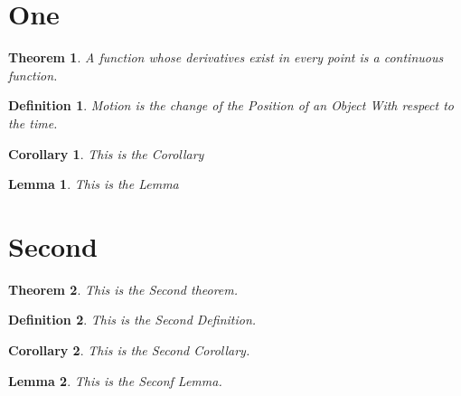 \documentclass{article}
\newtheorem{theorem}{Theorem}[section]
\newtheorem{definition}{Definition}[section]
\newtheorem{corollary}{Corollary}[section]
\newtheorem{lemma}{Lemma}[section]
\begin{document}
	\section{One}
	\begin{theorem}
		A function whose derivatives exist in every point is a continuous function.
	\end{theorem}
	\begin{definition}
		Motion is the change of the Position of an Object With respect to the time.
	\end{definition}
	\begin{corollary}
		This is the Corollary 
	\end{corollary}
	\begin{lemma}
		This is the Lemma
	\end{lemma}
	\section{Second}
	\begin{theorem}
		This is the Second theorem.
	\end{theorem}
	\begin{definition}
		This is the Second Definition.
	\end{definition}
	\begin{corollary}
		This is the Second Corollary.
	\end{corollary}
	\begin{lemma}
		This is the Seconf Lemma.
	\end{lemma}
\end{document}
